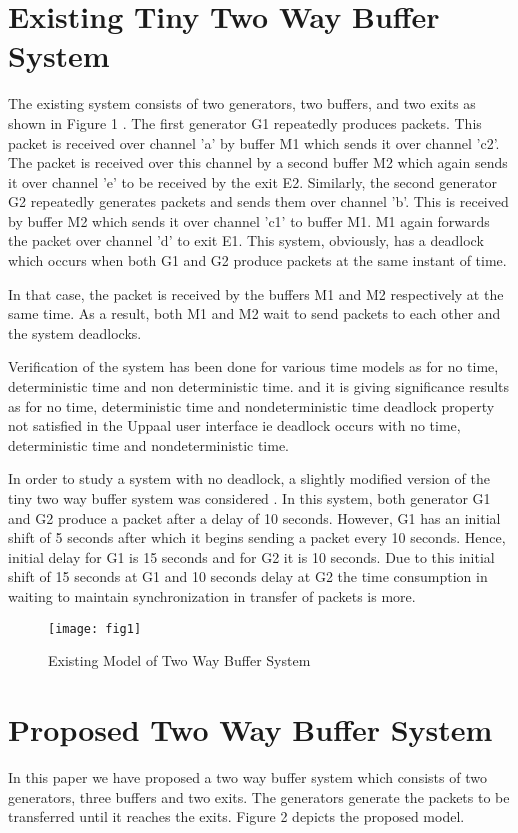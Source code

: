 \documentclass[letterpaper]{article}
\begin{document}
\section{Existing Tiny Two Way Buffer System}
\label{5}
The existing system consists of two generators, two buffers, and two exits as shown in Figure 1 \cite{AS11}. The first generator G1 repeatedly produces packets. This packet is received over channel 'a' by buffer M1 which sends it over channel 'c2'. The packet is received over this channel by a second buffer M2 which again sends it over channel 'e' to be received by the exit E2. Similarly, the second generator G2 repeatedly generates packets and sends them over channel 'b'. This is received by buffer M2 which sends it over channel 'c1' to buffer M1. M1 again forwards the packet over channel 'd' to exit E1. This system, obviously, has a deadlock which occurs when both G1 and G2 produce packets at the same instant of time. 
\par In that case, the packet is received by the buffers M1 and M2 respectively at the same time. As a result, both M1 and M2 wait to send packets to each other and the system deadlocks.
\par Verification of the system has been done for various time models as for no time, deterministic time and non deterministic time. and it is giving significance results as for no time, deterministic time and nondeterministic time deadlock property not satisfied in the Uppaal user interface ie deadlock occurs with no time, deterministic time and nondeterministic time.
\par In order to study a system with no deadlock, a slightly modified version of the tiny two way buffer system was considered \cite{AS11}. In this system, both generator G1 and G2 produce a packet after a delay of 10 seconds. However, G1 has an initial shift of 5 seconds after which it begins sending a packet every 10 seconds.
Hence, initial delay for G1 is 15 seconds and for G2 it is 10 seconds. Due to this initial shift of 15 seconds at G1 and 10 seconds delay at G2 the time consumption in waiting to maintain synchronization in transfer of packets is more.
\begin{figure}[bpht!]
\centering
	\texttt{[image: fig1]}
	\caption{Existing Model of Two Way Buffer System}
	\label{Fig1}
\end{figure}

	
\section{Proposed Two Way Buffer System}
\label{6}
In this paper we have proposed a two way buffer system which consists of two generators, three buffers and two exits. The generators generate the packets to be transferred until it reaches the exits. Figure 2 depicts the proposed model. 
\end{document}

